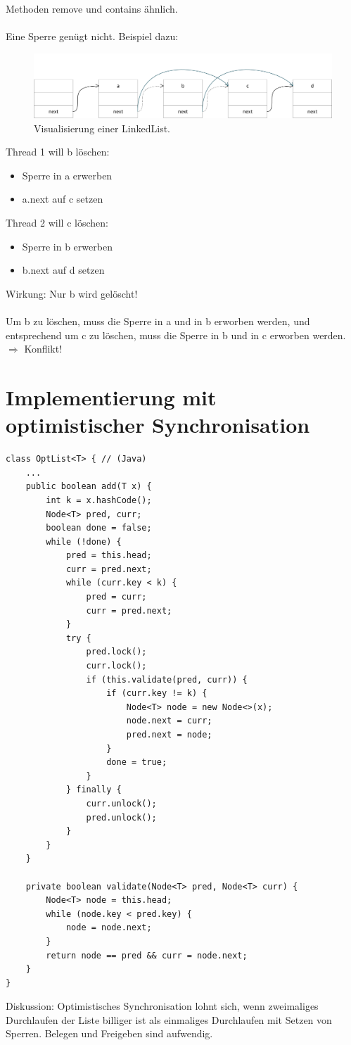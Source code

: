 Methoden remove und contains ähnlich.\\
\\
Eine Sperre genügt nicht. Beispiel dazu:
\begin{figure}[H]
	\begin{center}
		\includegraphics[width=\textwidth]{res/linkedlist_onelock}
		\caption{Visualisierung einer LinkedList.}
		\label{pic:linkedlistonelock}
	\end{center}
\end{figure} 
Thread 1 will b löschen:
\begin{itemize}
	\item Sperre in a erwerben
	\item a.next auf c setzen
\end{itemize}
Thread 2 will c löschen:
\begin{itemize}
	\item Sperre in b erwerben
	\item b.next auf d setzen
\end{itemize}
Wirkung: Nur b wird gelöscht!\\
\\
Um b zu löschen, muss die Sperre in a und in b erworben werden, und entsprechend um c zu löschen, muss die Sperre in b und in c erworben werden. $\Rightarrow$ Konflikt!

\section{Implementierung mit optimistischer Synchronisation}
\begin{lstlisting}
class OptList<T> { // (Java)
	...
	public boolean add(T x) {
		int k = x.hashCode();
		Node<T> pred, curr;
		boolean done = false;
		while (!done) {
			pred = this.head;
			curr = pred.next;
			while (curr.key < k) {
				pred = curr;
				curr = pred.next;
			}
			try {
				pred.lock();
				curr.lock();
				if (this.validate(pred, curr)) {
					if (curr.key != k) {
						Node<T> node = new Node<>(x);
						node.next = curr;
						pred.next = node;
					}
					done = true;
				}
			} finally {
				curr.unlock();
				pred.unlock();
			}
		}
	}
	
	private boolean validate(Node<T> pred, Node<T> curr) {
		Node<T> node = this.head;
		while (node.key < pred.key) {
			node = node.next;
		}
		return node == pred && curr = node.next;
	}
}
\end{lstlisting}
Diskussion: Optimistisches Synchronisation lohnt sich, wenn zweimaliges Durchlaufen der Liste billiger ist als einmaliges Durchlaufen mit Setzen von Sperren. Belegen und Freigeben sind aufwendig.

